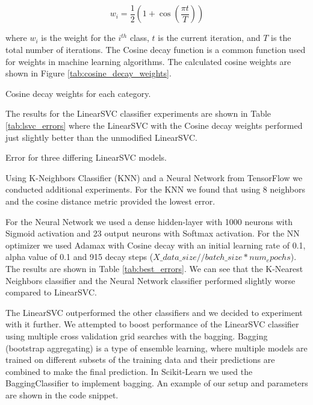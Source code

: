 \begin{equation}
    w_i = \frac{1}{2} \left(1 + \cos \left(\frac{\pi t}{T}\right)\right)
\label{eq:cosine_decay}
\end{equation}

where $w_i$ is the weight for the $i^{th}$ class, $t$ is the current iteration, and $T$ is the total number of iterations. The Cosine decay function is a common function used for weights in machine learning algorithms. The calculated cosine weights are shown in Figure \ref{tab:cosine_decay_weights}.

\begin{table}[!ht]
\centering
\caption{Cosine decay weights for each category.}

\label{tab:cosine_decay_weights}
\end{table}

The results for the LinearSVC classifier experiments are shown in Table \ref{tab:lsvc_errors} where the LinearSVC with the Cosine decay weights performed just slightly better than the unmodified LinearSVC.

\begin{table}[!ht]
\centering
\caption{Error for three differing LinearSVC models.}

\label{tab:lsvc_errors}
\end{table}

Using K-Neighbors Classifier (KNN) and a Neural Network from TensorFlow we conducted additional experiments. For the KNN we found that using 8 neighbors and the cosine distance metric provided the lowest error. 

For the Neural Network we used a dense hidden-layer with 1000 neurons with Sigmoid activation and 23 output neurons with Softmax activation. For the NN optimizer we used Adamax with Cosine decay with an initial learning rate of 0.1, alpha value of 0.1 and 915 decay steps ($X\_data\_size // batch\_size * num_epochs$). The results are shown in Table \ref{tab:best_errors}. We can see that the K-Nearest Neighbors classifier and the Neural Network classifier performed slightly worse compared to LinearSVC.

The LinearSVC outperformed the other classifiers and we decided to experiment with it further. We attempted to boost performance of the LinearSVC classifier using multiple cross validation grid searches with the bagging. Bagging (bootstrap aggregating) is a type of ensemble learning, where multiple models are trained on different subsets of the training data and their predictions are combined to make the final prediction. In Scikit-Learn we used the BaggingClassifier to implement bagging. An example of our setup and parameters are shown in the code snippet. 

